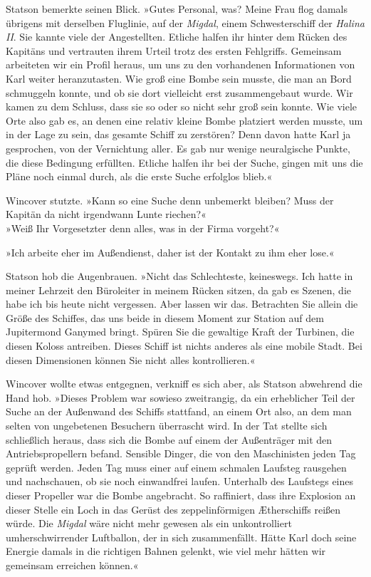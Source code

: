 Statson bemerkte seinen Blick. »Gutes Personal, was? Meine Frau
flog damals übrigens mit derselben Fluglinie, auf der
\textit{Migdal}, einem Schwesterschiff der \textit{Halina II}. Sie kannte
viele der Angestellten. Etliche halfen ihr hinter dem Rücken des
Kapitäns und vertrauten ihrem Urteil trotz des ersten Fehlgriffs.
Gemeinsam arbeiteten wir ein Profil heraus, um uns zu den
vorhandenen Informationen von Karl weiter heranzutasten. Wie groß
eine Bombe sein musste, die man an Bord schmuggeln konnte, und ob
sie dort vielleicht erst zusammengebaut wurde. Wir kamen zu dem
Schluss, dass sie so oder so nicht sehr groß sein konnte. Wie viele
Orte also gab es, an denen eine relativ kleine Bombe platziert
werden musste, um in der Lage zu sein, das gesamte Schiff zu
zerstören? Denn davon hatte Karl ja gesprochen, von der Vernichtung
aller. Es gab nur wenige neuralgische Punkte, die diese Bedingung
erfüllten. Etliche halfen ihr bei der Suche, gingen mit uns die
Pläne noch einmal durch, als die erste Suche erfolglos blieb.«

Wincover stutzte. »Kann so eine Suche denn unbemerkt bleiben? Muss
der Kapitän da nicht irgendwann Lunte riechen?«\\ »Weiß Ihr
Vorgesetzter denn alles, was in der Firma vorgeht?«

»Ich arbeite eher im Außendienst, daher ist der Kontakt zu ihm eher
lose.«

Statson hob die Augenbrauen. »Nicht das Schlechteste, keineswegs.
Ich hatte in meiner Lehrzeit den Büroleiter in meinem Rücken
sitzen, da gab es Szenen, die habe ich bis heute nicht vergessen.
Aber lassen wir das. Betrachten Sie allein die Größe des Schiffes,
das uns beide in diesem Moment zur Station auf dem Jupitermond
Ganymed bringt. Spüren Sie die gewaltige Kraft der Turbinen, die
diesen Koloss antreiben. Dieses Schiff ist nichts anderes als eine
mobile Stadt. Bei diesen Dimensionen können Sie nicht alles
kontrollieren.«

Wincover wollte etwas entgegnen, verkniff es sich aber, als Statson
abwehrend die Hand hob. »Dieses Problem war sowieso zweitrangig, da
ein erheblicher Teil der Suche an der Außenwand des Schiffs
stattfand, an einem Ort also, an dem man selten von ungebetenen
Besuchern überrascht wird. In der Tat stellte sich schließlich
heraus, dass sich die Bombe auf einem der Außenträger mit den
Antriebspropellern befand. Sensible Dinger, die von den
Maschinisten jeden Tag geprüft werden. Jeden Tag muss einer auf
einem schmalen Laufsteg rausgehen und nachschauen, ob sie noch
einwandfrei laufen. Unterhalb des Laufstegs eines dieser Propeller
war die Bombe angebracht. So raffiniert, dass ihre Explosion an
dieser Stelle ein Loch in das Gerüst des zeppelinförmigen
Ætherschiffs reißen würde. Die \textit{Migdal} wäre nicht mehr gewesen als
ein unkontrolliert umherschwirrender Luftballon, der in sich
zusammenfällt. Hätte Karl doch seine Energie damals in die
richtigen Bahnen gelenkt, wie viel mehr hätten wir gemeinsam
erreichen können.«

